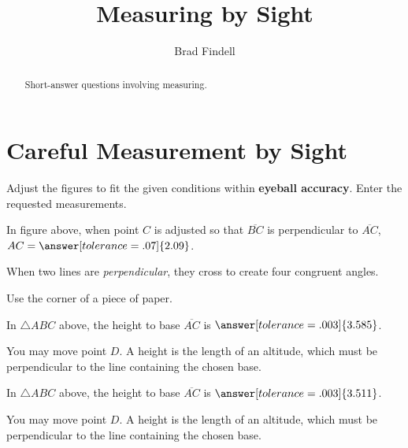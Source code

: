 \documentclass[nooutcomes]{ximera}
\title{Measuring by Sight}
\author{Brad Findell}
\begin{document}
\begin{abstract}
Short-answer questions involving measuring. 
\end{abstract}
\maketitle

\section{Careful Measurement by Sight}
Adjust the figures to fit the given conditions within \textbf{eyeball accuracy}.  Enter the requested measurements.  

\begin{problem}
\begin{center}  
\end{center}
In figure above, when point $C$ is adjusted so that $\overline{BC}$ is perpendicular to $\overline{AC}$, $AC=\answer[tolerance=.07]{2.09}$.
\begin{hint}
When two lines are \emph{perpendicular}, they cross to create four congruent angles. 
\end{hint}
\begin{hint}
Use the corner of a piece of paper.
\end{hint}
\end{problem}

\begin{problem}
\begin{center}  
\end{center}
In $\triangle ABC$ above, the height to base $\overline{AC}$ is $\answer[tolerance=.003]{3.585}$.
\begin{hint}
You may move point $D$.  A height is the length of an altitude, which must be perpendicular to the line containing the chosen base.  
\end{hint}
\end{problem}

\begin{problem}
\begin{center}  
\end{center}
In $\triangle ABC$ above, the height to base $\overline{AC}$ is $\answer[tolerance=.003]{3.511}$.
\begin{hint}
You may move point $D$.  A height is the length of an altitude, which must be perpendicular to the line containing the chosen base.  
\end{hint}
\end{problem}
\end{document}
